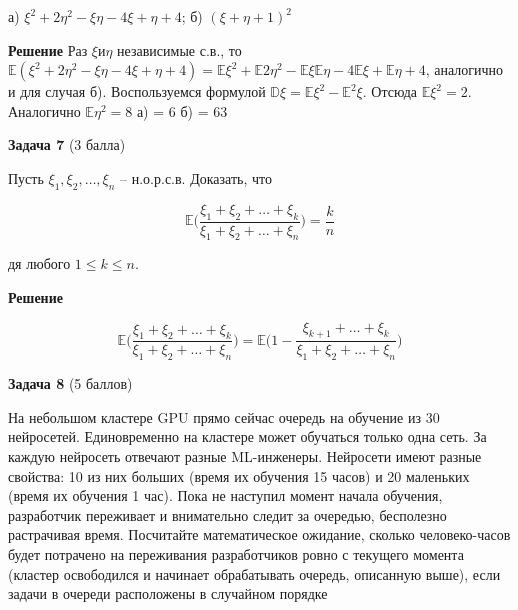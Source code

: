 \documentclass{article}
\begin{document}
а) $\xi^2 + 2\eta^2 - \xi\eta - 4\xi + \eta + 4$; б) $(\xi + \eta + 1)^2$

\textbf{Решение}
Раз $\xi и \eta$ независимые с.в., то $\mathbb{E}(\xi^2 + 2\eta^2 - \xi\eta - 4\xi + \eta + 4) = \mathbb{E}\xi^2 + \mathbb{E}2\eta^2 - \mathbb{E}\xi\mathbb{E}\eta - 4\mathbb{E}\xi + \mathbb{E}\eta + 4$, аналогично и для случая б).
Воспользуемся формулой $\mathbb{D}\xi = \mathbb{E}\xi^2 - \mathbb{E}^2\xi$.
Отсюда $\mathbb{E}\xi^2 = 2$.
Аналогично $\mathbb{E}\eta^2 = 8$
а) = 6
б) = 63

\textbf{Задача 7} (3 балла)

Пусть $\xi_1, \xi_2, \dots, \xi_n$ -- н.о.р.с.в. Доказать, что

$$\mathbb{E} \Big(\frac{\xi_1+\xi_2+\dots+\xi_k}{\xi_1+\xi_2+\dots+\xi_n\textbf{}}\Big)=\frac{k}{n}$$

дя любого $1 \leq k \leq n$.

\textbf{Решение}

$$\mathbb{E} \Big(\frac{\xi_1+\xi_2+\dots+\xi_k}{\xi_1+\xi_2+\dots+\xi_n\textbf{}}\Big) = \mathbb{E} \Big(1 - \frac{\xi_{k+1}+\dots+\xi_k}{\xi_1+\xi_2+\dots+\xi_n\textbf{}}\Big)$$


\textbf{Задача 8} (5 баллов)

На небольшом кластере GPU прямо сейчас очередь на обучение из 30 нейросетей. Единовременно на кластере может обучаться только одна сеть. За каждую нейросеть отвечают разные ML-инженеры. Нейросети имеют разные свойства: 10 из них больших (время их обучения 15 часов) и 20 маленьких (время их обучения 1 час). Пока не наступил момент начала обучения, разработчик переживает и внимательно следит за очередью, бесполезно растрачивая время. Посчитайте математическое ожидание, сколько человеко-часов будет потрачено на переживания разработчиков ровно с текущего момента (кластер освободился и начинает обрабатывать очередь, описанную выше), если задачи в очереди расположены в случайном порядке
\end{document}
